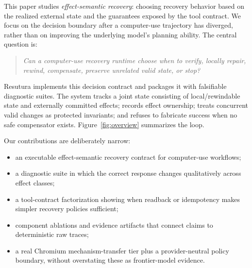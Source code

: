\documentclass{article}
\begin{document}
This paper studies \emph{effect-semantic recovery}: choosing recovery behavior based on the realized external state and the guarantees exposed by the tool contract. We focus on the decision boundary after a computer-use trajectory has diverged, rather than on improving the underlying model's planning ability. The central question is:

\begin{quote}
\emph{Can a computer-use recovery runtime choose when to verify, locally repair, rewind, compensate, preserve unrelated valid state, or stop?}
\end{quote}

Resutura implements this decision contract and packages it with falsifiable diagnostic suites. The system tracks a joint state consisting of local/rewindable state and externally committed effects; records effect ownership; treats concurrent valid changes as protected invariants; and refuses to fabricate success when no safe compensator exists. Figure~\ref{fig:overview} summarizes the loop.

Our contributions are deliberately narrow:
\begin{itemize}
    \item an executable effect-semantic recovery contract for computer-use workflows;
    \item a diagnostic suite in which the correct response changes qualitatively across effect classes;
    \item a tool-contract factorization showing when readback or idempotency makes simpler recovery policies sufficient;
    \item component ablations and evidence artifacts that connect claims to deterministic raw traces;
    \item a real Chromium mechanism-transfer tier plus a provider-neutral policy boundary, without overstating these as frontier-model evidence.
\end{itemize}
\end{document}
